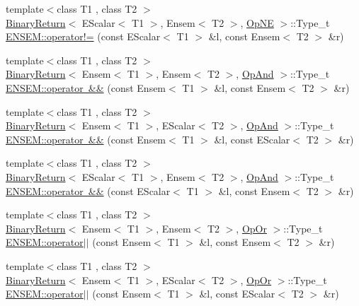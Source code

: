 \begin{DoxyCompactItemize}
\item 
{\footnotesize template$<$class T1 , class T2 $>$ }\\\mbox{\hyperlink{structBinaryReturn}{Binary\+Return}}$<$ E\+Scalar$<$ T1 $>$, Ensem$<$ T2 $>$, \mbox{\hyperlink{structOpNE}{Op\+NE}} $>$\+::Type\+\_\+t \mbox{\hyperlink{group__eensem_ga312278f2450b3a4afdfd443566c93d0a}{E\+N\+S\+E\+M\+::operator!=}} (const E\+Scalar$<$ T1 $>$ \&l, const Ensem$<$ T2 $>$ \&r)
\item 
{\footnotesize template$<$class T1 , class T2 $>$ }\\\mbox{\hyperlink{structBinaryReturn}{Binary\+Return}}$<$ Ensem$<$ T1 $>$, Ensem$<$ T2 $>$, \mbox{\hyperlink{structOpAnd}{Op\+And}} $>$\+::Type\+\_\+t \mbox{\hyperlink{group__eensem_ga1a9761f53df3f59110335a2a8cf2d67c}{E\+N\+S\+E\+M\+::operator \&\&}} (const Ensem$<$ T1 $>$ \&l, const Ensem$<$ T2 $>$ \&r)
\item 
{\footnotesize template$<$class T1 , class T2 $>$ }\\\mbox{\hyperlink{structBinaryReturn}{Binary\+Return}}$<$ Ensem$<$ T1 $>$, E\+Scalar$<$ T2 $>$, \mbox{\hyperlink{structOpAnd}{Op\+And}} $>$\+::Type\+\_\+t \mbox{\hyperlink{group__eensem_ga00415a6169d18f80656be828f11a157b}{E\+N\+S\+E\+M\+::operator \&\&}} (const Ensem$<$ T1 $>$ \&l, const E\+Scalar$<$ T2 $>$ \&r)
\item 
{\footnotesize template$<$class T1 , class T2 $>$ }\\\mbox{\hyperlink{structBinaryReturn}{Binary\+Return}}$<$ E\+Scalar$<$ T1 $>$, Ensem$<$ T2 $>$, \mbox{\hyperlink{structOpAnd}{Op\+And}} $>$\+::Type\+\_\+t \mbox{\hyperlink{group__eensem_ga327bfc24e647dfce0a0b0373f4e72084}{E\+N\+S\+E\+M\+::operator \&\&}} (const E\+Scalar$<$ T1 $>$ \&l, const Ensem$<$ T2 $>$ \&r)
\item 
{\footnotesize template$<$class T1 , class T2 $>$ }\\\mbox{\hyperlink{structBinaryReturn}{Binary\+Return}}$<$ Ensem$<$ T1 $>$, Ensem$<$ T2 $>$, \mbox{\hyperlink{structOpOr}{Op\+Or}} $>$\+::Type\+\_\+t \mbox{\hyperlink{group__eensem_ga5e2d1d875f2929ebe89f76b2d73b0a34}{E\+N\+S\+E\+M\+::operator$\vert$$\vert$}} (const Ensem$<$ T1 $>$ \&l, const Ensem$<$ T2 $>$ \&r)
\item 
{\footnotesize template$<$class T1 , class T2 $>$ }\\\mbox{\hyperlink{structBinaryReturn}{Binary\+Return}}$<$ Ensem$<$ T1 $>$, E\+Scalar$<$ T2 $>$, \mbox{\hyperlink{structOpOr}{Op\+Or}} $>$\+::Type\+\_\+t \mbox{\hyperlink{group__eensem_ga575e86e9777d7a353311ab43c237a84b}{E\+N\+S\+E\+M\+::operator$\vert$$\vert$}} (const Ensem$<$ T1 $>$ \&l, const E\+Scalar$<$ T2 $>$ \&r)

\end{DoxyCompactItemize}
